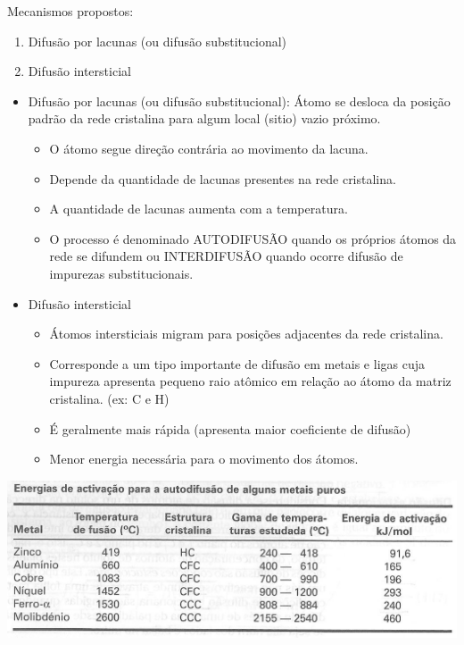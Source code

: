 Mecanismos propostos:

\begin{enumerate}
	\item Difusão por lacunas (ou difusão substitucional)
	\item Difusão intersticial
	
\end{enumerate}


\begin{itemize}
	\item Difusão por lacunas (ou difusão substitucional): Átomo se desloca da posição padrão da rede cristalina para algum local (sitio) vazio próximo.
	\begin{itemize}
		\item O átomo segue direção contrária ao movimento da lacuna.
		\item Depende da quantidade de lacunas presentes na rede cristalina.
		\item A quantidade de lacunas aumenta com a temperatura.
		\item O processo é denominado AUTODIFUSÃO quando os próprios átomos da rede se difundem ou INTERDIFUSÃO quando ocorre difusão de impurezas substitucionais.
	\end{itemize}
	\item Difusão intersticial
	\begin{itemize}
		\item Átomos intersticiais migram para posições adjacentes da rede cristalina.
		\item Corresponde a um tipo importante de difusão em metais e ligas cuja impureza apresenta pequeno raio atômico em relação ao átomo da matriz cristalina. (ex: C e H)
		\item É geralmente mais rápida (apresenta maior coeficiente de difusão)
		\item Menor energia necessária para o movimento dos átomos.
	\end{itemize}
\end{itemize}

\includegraphics[scale=0.2,trim={0 0 0 0}]{figures/Eativacao}

